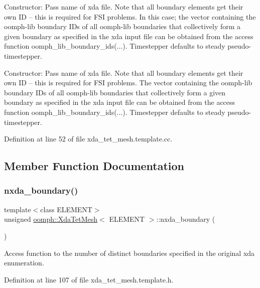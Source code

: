 Constructor\+: Pass name of xda file. Note that all boundary elements get their own ID -- this is required for F\+SI problems. In this case; the vector containing the oomph-\/lib boundary I\+Ds of all oomph-\/lib boundaries that collectively form a given boundary as specified in the xda input file can be obtained from the access function oomph\+\_\+lib\+\_\+boundary\+\_\+ids(...). Timestepper defaults to steady pseudo-\/timestepper. 

Constructor\+: Pass name of xda file. Note that all boundary elements get their own ID -- this is required for F\+SI problems. The vector containing the oomph-\/lib boundary I\+Ds of all oomph-\/lib boundaries that collectively form a given boundary as specified in the xda input file can be obtained from the access function oomph\+\_\+lib\+\_\+boundary\+\_\+ids(...). Timestepper defaults to steady pseudo-\/timestepper. 

Definition at line 52 of file xda\+\_\+tet\+\_\+mesh.\+template.\+cc.



\subsection{Member Function Documentation}
\mbox{\label{classoomph_1_1XdaTetMesh_ad81712bc6c7215d64494ccafc8c99dd5}} 
\subsubsection{\texorpdfstring{nxda\+\_\+boundary()}{nxda\_boundary()}}
{\footnotesize\ttfamily template$<$class E\+L\+E\+M\+E\+NT$>$ \\
unsigned \hyperlink{classoomph_1_1XdaTetMesh}{oomph\+::\+Xda\+Tet\+Mesh}$<$ E\+L\+E\+M\+E\+NT $>$\+::nxda\+\_\+boundary (\begin{DoxyParamCaption}{ }\end{DoxyParamCaption})\hspace{0.3cm}{\ttfamily [inline]}}



Access function to the number of distinct boundaries specified in the original xda enumeration. 



Definition at line 107 of file xda\+\_\+tet\+\_\+mesh.\+template.\+h.



